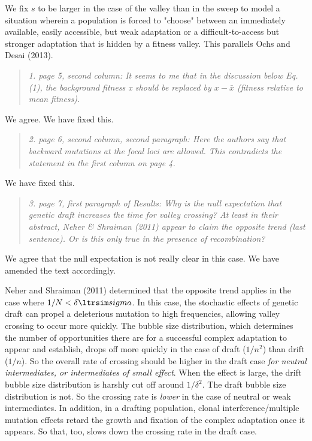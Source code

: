 \documentclass[11pt]{article}
\newenvironment{reviewerquote}{\begin{quote}\color{black}\itshape}{\end{quote}}
\begin{document}
We fix $s$ to be larger in the case of the valley than in the sweep to model a situation wherein a population is forced to "choose" between an immediately available, easily accessible, but weak adaptation or a difficult-to-access but stronger adaptation that is hidden by a fitness valley. This parallels Ochs and Desai (2013).

\begin{reviewerquote}
1. page 5, second column: It seems to me that in the discussion below Eq.(1), the background fitness x should be replaced by $x - \bar{x}$ (fitness relative to mean fitness). 
\end{reviewerquote}

We agree. We have fixed this.

\begin{reviewerquote}
2. page 6, second column, second paragraph: Here the authors say that backward mutations at the focal loci are allowed. This contradicts the statement in the first column on page 4.
\end{reviewerquote}

We have fixed this.

\begin{reviewerquote}
3. page 7, first paragraph of Results: Why is the null expectation that genetic draft increases the time for valley crossing? At least in their abstract, Neher \& Shraiman (2011) appear to claim the opposite trend (last sentence). Or is this only true in the presence of recombination?
\end{reviewerquote}

We agree that the null expectation is not really clear in this case. We have amended the text accordingly.

Neher and Shraiman (2011) determined that the opposite trend applies in the case where $1/N < \delta \ltrsim sigma$. In this case, the stochastic effects of genetic draft can propel a deleterious mutation to high frequencies, allowing valley crossing to occur more quickly. The bubble size distribution, which determines the number of opportunities there are for a successful complex adaptation to appear and establish, drops off more quickly in the case of draft ($1/n^2$) than drift ($1/n$). So the overall rate of crossing should be higher in the draft case \emph{for neutral intermediates, or intermediates of small effect}. When the effect is large, the drift bubble size distribution is harshly cut off around $1/\delta^2$. The draft bubble size distribution is not. So the crossing rate is \emph{lower} in the case of neutral or weak intermediates. In addition, in a drafting population, clonal interference/multiple mutation effects retard the growth and fixation of the complex adaptation once it appears. So that, too, slows down the crossing rate in the draft case.
\end{document}
